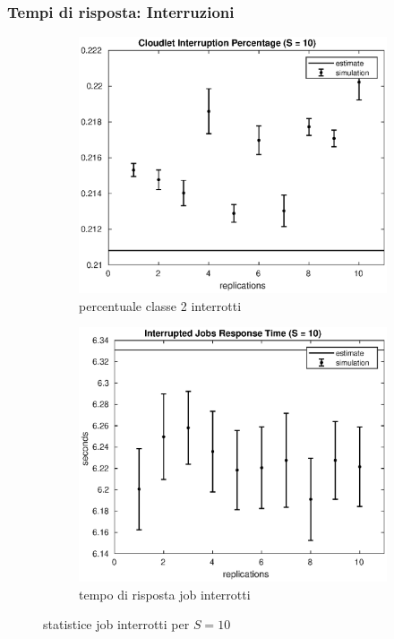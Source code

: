 \subsubsection{Tempi di risposta: Interruzioni}
%
\begin{figure}[!h]
\centering
%
\begin{subfigure}[t]{0.49\textwidth}
\includegraphics[width=\textwidth]{figures/simul/10_500K_intperc}
\caption{percentuale classe 2 interrotti}
\label{10_intperc}
\end{subfigure}
%
\begin{subfigure}[t]{0.49\textwidth}
\includegraphics[width=\textwidth]{figures/simul/10_500K_sintr}
\caption{tempo di risposta job interrotti}
\label{10_s2cloud}
\end{subfigure}
%
\caption{statistice job interrotti per $S=10$}
\end{figure}

